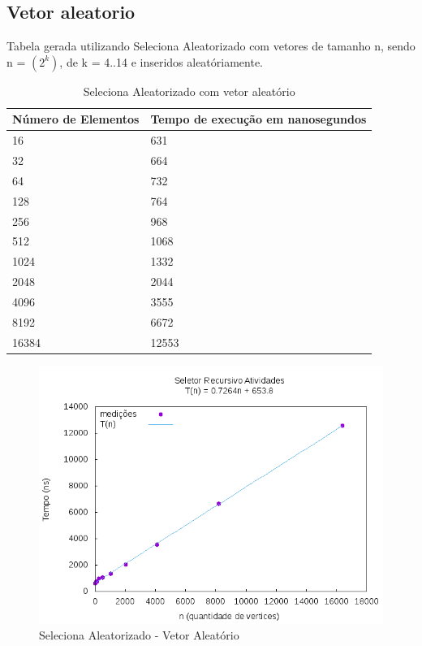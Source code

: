\documentclass[12pt,a4paper,twoside]{report}
\begin{document}
\subsection{Vetor aleatorio}
Tabela gerada utilizando Seleciona Aleatorizado com vetores de tamanho n, sendo n = $(2^k)$, de k = 4..14 e inseridos aleatóriamente.
\begin{table}[H]
\centering
\caption{Seleciona Aleatorizado com vetor aleatório}
\label{my-label}
\begin{tabular}{|l|l|}
\hline
\multicolumn{1}{|c|}{\textbf{Número de Elementos}} & \multicolumn{1}{c|}{\textbf{Tempo de execução em nanosegundos}} \\ \hline
16 & 631 \\ \hline
32 & 664 \\ \hline
64 & 732 \\ \hline
128 & 764 \\ \hline
256 & 968 \\ \hline
512 & 1068 \\ \hline
1024 & 1332 \\ \hline
2048 & 2044 \\ \hline
4096 & 3555 \\ \hline
8192 & 6672 \\ \hline
16384 & 12553 \\ \hline

\end{tabular}
\end{table}

\begin{figure}[H]
    \centering
    \includegraphics[width=0.7\linewidth]{graficos/SelecionaAleatorizado/SeletorRecursivoAtividades.png}
  \caption{Seleciona Aleatorizado - Vetor Aleatório}
\end{figure}

%
%
\end{document}
